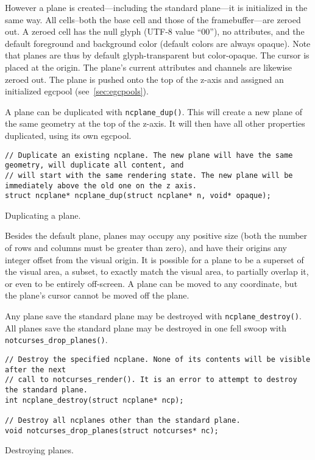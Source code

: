 However a plane is created---including the standard plane---it is initialized
in the same way. All cells--both the base cell and those of the
framebuffer---are zeroed out. A zeroed cell has the null glyph (UTF-8
value ``00''), no attributes, and the default foreground and background color
(default colors are always opaque). Note that planes are thus by default
glyph-transparent but color-opaque. The cursor is placed at the origin. The
plane's current attributes and channels are likewise zeroed out. The plane is
pushed onto the top of the z-axis and assigned an initialized egcpool
(see~\ref{sec:egcpools}).

A plane can be duplicated with \texttt{ncplane\_dup()}. This will create a new
plane of the same geometry at the top of the z-axis. It will then have all
other properties duplicated, using its own egcpool.
\begin{listing}[!htbp]
\begin{verbatim}
// Duplicate an existing ncplane. The new plane will have the same geometry, will duplicate all content, and
// will start with the same rendering state. The new plane will be immediately above the old one on the z axis.
struct ncplane* ncplane_dup(struct ncplane* n, void* opaque);
\end{verbatim}
\caption{Duplicating a plane.}
\end{listing}

Besides the default plane, planes may occupy any positive size (both the number
of rows and columns must be greater than zero), and have their origins any
integer offset from the visual origin. It is possible for a plane to be a
superset of the visual area, a subset, to exactly match the visual area, to
partially overlap it, or even to be entirely off-screen. A plane can be
moved to any coordinate, but the plane's cursor cannot be moved off the plane.

Any plane save the standard plane may be destroyed with \texttt{ncplane\_destroy()}.
All planes save the standard plane may be destroyed in one fell swoop with
\texttt{notcurses\_drop\_planes()}.
\begin{listing}[!htbp]
\begin{verbatim}
// Destroy the specified ncplane. None of its contents will be visible after the next
// call to notcurses_render(). It is an error to attempt to destroy the standard plane.
int ncplane_destroy(struct ncplane* ncp);

// Destroy all ncplanes other than the standard plane.
void notcurses_drop_planes(struct notcurses* nc);
\end{verbatim}
\caption{Destroying planes.}
\end{listing}

